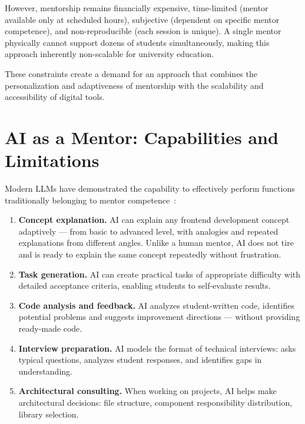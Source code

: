 \documentclass[conference,a4paper]{IEEEtran}
\begin{document}
However, mentorship remains financially expensive, time-limited (mentor available only at scheduled hours), subjective (dependent on specific mentor competence), and non-reproducible (each session is unique). A single mentor physically cannot support dozens of students simultaneously, making this approach inherently non-scalable for university education.

These constraints create a demand for an approach that combines the personalization and adaptiveness of mentorship with the scalability and accessibility of digital tools.

\section{AI as a Mentor: Capabilities and Limitations}

Modern LLMs have demonstrated the capability to effectively perform functions traditionally belonging to mentor competence~\cite{kazemitabaar2023, systematic2025}:

\begin{enumerate}
\item \textbf{Concept explanation.} AI can explain any frontend development concept adaptively --- from basic to advanced level, with analogies and repeated explanations from different angles. Unlike a human mentor, AI does not tire and is ready to explain the same concept repeatedly without frustration.

\item \textbf{Task generation.} AI can create practical tasks of appropriate difficulty with detailed acceptance criteria, enabling students to self-evaluate results.

\item \textbf{Code analysis and feedback.} AI analyzes student-written code, identifies potential problems and suggests improvement directions --- without providing ready-made code.

\item \textbf{Interview preparation.} AI models the format of technical interviews: asks typical questions, analyzes student responses, and identifies gaps in understanding.

\item \textbf{Architectural consulting.} When working on projects, AI helps make architectural decisions: file structure, component responsibility distribution, library selection.
\end{enumerate}
\end{document}
